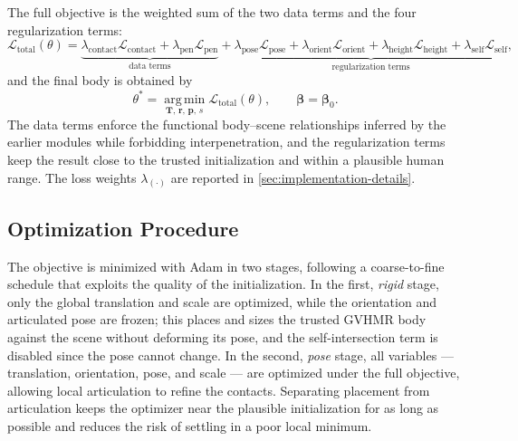 The full objective is the weighted sum of the two data terms and the four regularization terms:
\begin{equation}
\label{eq:optimization-total-loss}
\mathcal{L}_{\mathrm{total}}(\theta)
=
\underbrace{
\lambda_{\mathrm{contact}} \mathcal{L}_{\mathrm{contact}}
+
\lambda_{\mathrm{pen}} \mathcal{L}_{\mathrm{pen}}
}_{\text{data terms}}
+
\underbrace{
\lambda_{\mathrm{pose}} \mathcal{L}_{\mathrm{pose}}
+
\lambda_{\mathrm{orient}} \mathcal{L}_{\mathrm{orient}}
+
\lambda_{\mathrm{height}} \mathcal{L}_{\mathrm{height}}
+
\lambda_{\mathrm{self}} \mathcal{L}_{\mathrm{self}}
}_{\text{regularization terms}} ,
\end{equation}
and the final body is obtained by
\begin{equation}
\label{eq:optimization-argmin}
\theta^{\ast}
=
\operatorname*{arg\,min}_{\mathbf{T},\, \mathbf{r},\, \mathbf{p},\, s}
\mathcal{L}_{\mathrm{total}}(\theta),
\qquad
\boldsymbol{\beta} = \boldsymbol{\beta}_0.
\end{equation}
The data terms enforce the functional body--scene relationships inferred by the earlier modules while forbidding interpenetration, and the regularization terms keep the result close to the trusted initialization and within a plausible human range. The loss weights $\lambda_{(\cdot)}$ are reported in \cref{sec:implementation-details}.

\subsection{Optimization Procedure}
\label{sec:method-optimization-procedure}

The objective is minimized with Adam in two stages, following a coarse-to-fine schedule that exploits the quality of the initialization. In the first, \emph{rigid} stage, only the global translation and scale are optimized, while the orientation and articulated pose are frozen; this places and sizes the trusted GVHMR body against the scene without deforming its pose, and the self-intersection term is disabled since the pose cannot change. In the second, \emph{pose} stage, all variables --- translation, orientation, pose, and scale --- are optimized under the full objective, allowing local articulation to refine the contacts. Separating placement from articulation keeps the optimizer near the plausible initialization for as long as possible and reduces the risk of settling in a poor local minimum.

